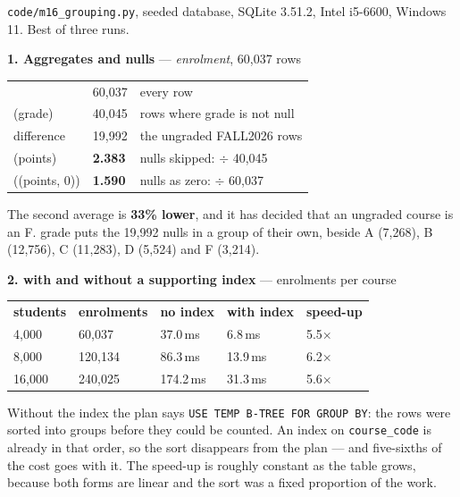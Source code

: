\begin{measured}
\textsf{\footnotesize \texttt{code/m16\_grouping.py}, seeded database,
SQLite 3.51.2, Intel i5-6600, Windows 11. Best of three runs.}

\medskip
\textbf{1. Aggregates and nulls} --- \textit{enrolment}, 60{,}037 rows

\begin{tabular}{@{}L{6.4cm}R{2.4cm}L{5.4cm}@{}}
      & 60{,}037 & every row \\
(grade)  & 40{,}045 & rows where grade is not null \\
difference            & 19{,}992 & the ungraded FALL2026 rows \\
(points)   & \textbf{2.383} & nulls skipped: $\div$ 40{,}045 \\
((points, 0)) & \textbf{1.590} & nulls as zero:
  $\div$ 60{,}037 \\
\end{tabular}

\smallskip
The second average is \textbf{33\% lower}, and it has decided that an ungraded
course is an F.  grade puts the 19{,}992 nulls in a group of
their own, beside A (7{,}268), B (12{,}756), C (11{,}283), D (5{,}524) and F
(3{,}214).

\medskip
\textbf{2.  with and without a supporting index} --- enrolments
per course

\begin{tabular}{@{}R{2.0cm}R{2.4cm}R{2.6cm}R{2.6cm}R{2.4cm}@{}}
\textbf{students} & \textbf{enrolments} & \textbf{no index} & \textbf{with index}
& \textbf{speed-up} \\
4{,}000  & 60{,}037  & 37.0\,ms  & 6.8\,ms  & 5.5$\times$ \\
8{,}000  & 120{,}134 & 86.3\,ms  & 13.9\,ms & 6.2$\times$ \\
16{,}000 & 240{,}025 & 174.2\,ms & 31.3\,ms & 5.6$\times$ \\
\end{tabular}

\smallskip
Without the index the plan says \texttt{USE TEMP B-TREE FOR GROUP BY}: the
rows were sorted into groups before they could be counted. An index on
\texttt{course\_code} is already in that order, so the sort disappears from the
plan --- and five-sixths of the cost goes with it. The speed-up is roughly
constant as the table grows, because both forms are linear and the sort was a
fixed proportion of the work.


\end{measured}

